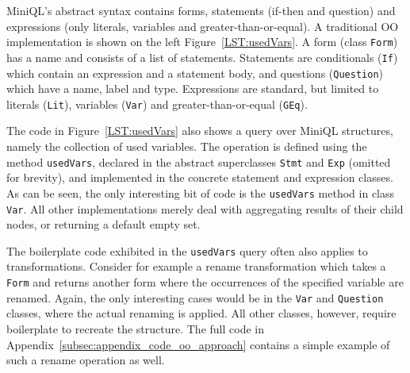 MiniQL's abstract syntax contains forms, statements (if-then and question) and expressions (only literals, variables and greater-than-or-equal).
A traditional OO implementation is shown on the left Figure~\ref{LST:usedVars}.
A form (class \lstinline{Form}) has a name and consists of a list of statements.
Statements are conditionals (\lstinline{If}) which contain an expression and a statement body, and questions (\lstinline{Question}) which have a name, label and type. Expressions are standard, but limited to literals (\lstinline{Lit}), variables (\lstinline{Var}) and greater-than-or-equal (\lstinline{GEq}).




The code in Figure~\ref{LST:usedVars} also shows a query over MiniQL structures, namely the collection of used variables.
The operation is defined using the method \lstinline{usedVars}, declared in the abstract superclasses  \lstinline{Stmt} and \lstinline{Exp} (omitted for brevity), and implemented in the concrete statement and expression classes.
As can be seen, the only interesting bit of code is the \lstinline{usedVars} method in class \lstinline{Var}.
All other implementations merely deal with aggregating results of their child nodes, or returning a default empty set.

The boilerplate code exhibited in the \lstinline{usedVars} query often
also applies to transformations.  Consider for example a rename
transformation which takes a \lstinline{Form} and returns another form
where the occurrences of the specified variable are renamed.  Again, the only interesting cases would be
in the \lstinline{Var} and {\small\texttt{Question}} classes, where the actual renaming is
applied. All other classes, however, require boilerplate to recreate
the structure. The full code in
Appendix~\ref{subsec:appendix_code_oo_approach} contains a simple
example of such a rename operation as well.




